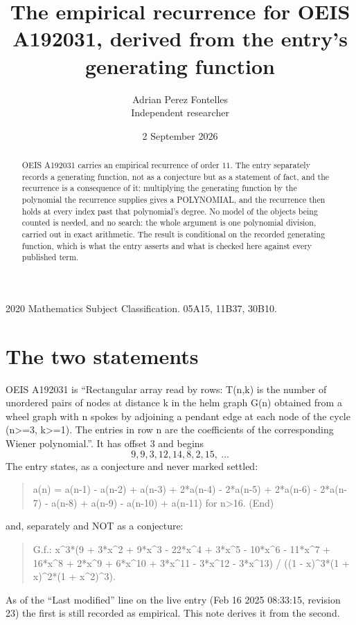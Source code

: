 \documentclass[11pt,a4paper]{article}
\title{The empirical recurrence for OEIS A192031, derived from the entry's generating function}
\author{Adrian Perez Fontelles\\ \small Independent researcher}
\date{2 September 2026}
\theoremstyle{plain}
\theoremstyle{definition}
\begin{document}
\maketitle

\begin{abstract}
OEIS A192031 carries an empirical recurrence of order $11$. The entry separately records a
generating function, not as a conjecture but as a statement of fact, and the recurrence is a
consequence of it: multiplying the generating function by the polynomial the recurrence
supplies gives a POLYNOMIAL, and the recurrence then holds at every index past that
polynomial's degree. No model of the objects being counted is needed, and no search: the
whole argument is one polynomial division, carried out in exact arithmetic. The result is
conditional on the recorded generating function, which is what the entry asserts and what is
checked here against every published term.
\end{abstract}

\noindent\small 2020 Mathematics Subject Classification. 05A15, 11B37, 30B10.\normalsize

\section{The two statements}

OEIS A192031 is ``Rectangular array read by rows: T(n,k) is the number of unordered pairs of nodes at distance k in the helm graph G(n) obtained from a wheel graph with n spokes by adjoining a pendant edge at each node of the cycle (n>=3, k>=1). The entries in row n are the coefficients of the corresponding Wiener polynomial.''. It has offset $3$ and begins
\[
9, 9, 3, 12, 14, 8, 2, 15,\ \dots
\]
The entry states, as a conjecture and never marked settled:
\begin{quote}
a(n) = a(n-1) - a(n-2) + a(n-3) + 2*a(n-4) - 2*a(n-5) + 2*a(n-6) - 2*a(n-7) - a(n-8) + a(n-9) - a(n-10) + a(n-11) for n>16. (End)
\end{quote}
and, separately and NOT as a conjecture:
\begin{quote}
G.f.: x\^{}3*(9 + 3*x\^{}2 + 9*x\^{}3 - 22*x\^{}4 + 3*x\^{}5 - 10*x\^{}6 - 11*x\^{}7 + 16*x\^{}8 + 2*x\^{}9 + 6*x\^{}10 + 3*x\^{}11 - 3*x\^{}12 - 3*x\^{}13) / ((1 - x)\^{}3*(1 + x)\^{}2*(1 + x\^{}2)\^{}3).
\end{quote}
As of the ``Last modified'' line on the live entry (Feb 16 2025 08:33:15, revision 23) the first is still
recorded as empirical. This note derives it from the second.
\end{document}
